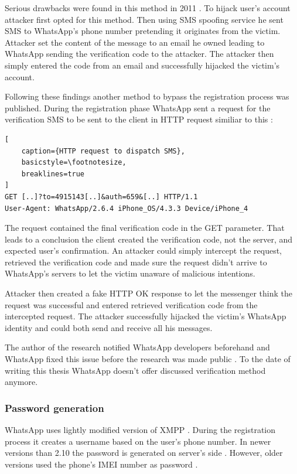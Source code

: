 \documentclass[thesis=M,english]{FITthesis}[2012/10/20]
\begin{document}
Serious drawbacks were found in this method in 2011 \cite{whatsapp-hijack1}. To hijack user's account attacker first opted for this method. Then using SMS spoofing service he sent SMS to WhatsApp's phone number pretending it originates from the victim. Attacker set the content of the message to an email he owned leading to WhatsApp sending the verification code to the attacker. The attacker then simply entered the code from an email and successfully hijacked the victim's account.

Following these findings another method to bypass the registration process was published. During the registration phase WhatsApp sent a request for the verification SMS to be sent to the client in HTTP request similiar to this \cite{whatsapp-shootingthemsg}:


\begin{lstlisting}[
	caption={HTTP request to dispatch SMS},
	basicstyle=\footnotesize,
	breaklines=true
]
GET [..]?to=4915143[..]&auth=659&[..] HTTP/1.1
User-Agent: WhatsApp/2.6.4 iPhone_OS/4.3.3 Device/iPhone_4
\end{lstlisting}

The request contained the final verification code in the GET parameter. That leads to a conclusion the client created the verification code, not the server, and expected user's confirmation. An attacker could simply intercept the request, retrieved the verification code and made sure the request didn't arrive to WhatsApp's servers to let the victim unaware of malicious intentions.

Attacker then created a fake HTTP OK response to let the messenger think the request was successful and entered retrieved verification code from the intercepted request. The attacker successfully hijacked the victim's WhatsApp identity and could both send and receive all his messages.

The author of the research notified WhatsApp developers beforehand and WhatsApp fixed this issue before the research was made public \cite{whatsapp-shootingthemsg}. To the date of writing this thesis WhatsApp doesn't offer discussed verification method anymore.


\subsubsection{Password generation}

WhatsApp uses lightly modified version of XMPP \cite{whatsapp-xmpp}. During the registration process it creates a username based on the user's phone number. In newer versions than 2.10 the password is generated on server's side \cite{whatsapp-imei}. However, older versions used the phone's IMEI  number as password \cite{whatsapp-imei, whatsapp-imei2}.
\end{document}
